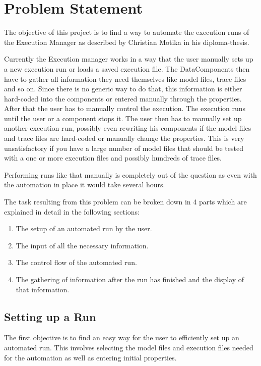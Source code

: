 \chapter{Problem Statement}
\label{chapter:AutoTask}
The objective of this project is to find a way to automate the execution
runs of the Execution Manager as described by Christian Motika in his
diploma-thesis\cite{cmot-dt}.

Currently the Execution manager works in a way that the user manually sets up
a new execution run or loads a saved execution file. The DataComponents then have 
to gather all information they need themselves like model files, trace files and so on.
Since there is no generic way to do that, this information is either hard-coded into
the components or entered manually through the properties.
After that the user has to manually control the execution. The execution runs until
the user or a component stops it. The user then has to manually set up another
execution run, possibly even rewriting his components if the model files
and trace files are hard-coded or manually change the properties.
This is very unsatisfactory if you have a large number of model files that
should be tested with a one or more execution files and possibly hundreds of trace files.

Performing runs like that manually is completely out of the question as even
with the automation in place it would take several hours.

The task resulting from this problem can be broken down in 4 parts which are explained in detail in
the following sections:
\begin{enumerate}
 \item The setup of an automated run by the user.
 \item The input of all the necessary information.
 \item The control flow of the automated run.
 \item The gathering of information after the run has finished and the display 
of that information.
\end{enumerate}

\section{Setting up a Run}
\label{section:AutoTaskSetup}
The first objective is to find an easy way for the user to efficiently set up an
automated run. This involves selecting the model files and execution files
needed for the automation as well as entering initial properties.

